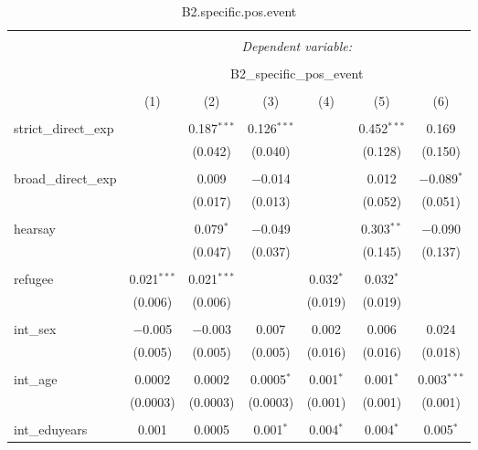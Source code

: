 
\begin{table}[H] \centering 
  \caption{B2.specific.pos.event} 
  \label{} 
\tiny 
\begin{tabular}{@{\extracolsep{4pt}}lcccccc} 
\\[-1.8ex]\hline 
\hline \\[-1.8ex] 
 & \multicolumn{6}{c}{\textit{Dependent variable:}} \\ 
\cline{2-7} 
\\[-1.8ex] & \multicolumn{6}{c}{B2\_specific\_pos\_event} \\ 
\\[-1.8ex] & (1) & (2) & (3) & (4) & (5) & (6)\\ 
\hline \\[-1.8ex] 
 strict\_direct\_exp &  & 0.187$^{***}$ & 0.126$^{***}$ &  & 0.452$^{***}$ & 0.169 \\ 
  &  & (0.042) & (0.040) &  & (0.128) & (0.150) \\ 
  & & & & & & \\ 
 broad\_direct\_exp &  & 0.009 & $-$0.014 &  & 0.012 & $-$0.089$^{*}$ \\ 
  &  & (0.017) & (0.013) &  & (0.052) & (0.051) \\ 
  & & & & & & \\ 
 hearsay &  & 0.079$^{*}$ & $-$0.049 &  & 0.303$^{**}$ & $-$0.090 \\ 
  &  & (0.047) & (0.037) &  & (0.145) & (0.137) \\ 
  & & & & & & \\ 
 refugee & 0.021$^{***}$ & 0.021$^{***}$ &  & 0.032$^{*}$ & 0.032$^{*}$ &  \\ 
  & (0.006) & (0.006) &  & (0.019) & (0.019) &  \\ 
  & & & & & & \\ 
 int\_sex & $-$0.005 & $-$0.003 & 0.007 & 0.002 & 0.006 & 0.024 \\ 
  & (0.005) & (0.005) & (0.005) & (0.016) & (0.016) & (0.018) \\ 
  & & & & & & \\ 
 int\_age & 0.0002 & 0.0002 & 0.0005$^{*}$ & 0.001$^{*}$ & 0.001$^{*}$ & 0.003$^{***}$ \\ 
  & (0.0003) & (0.0003) & (0.0003) & (0.001) & (0.001) & (0.001) \\ 
  & & & & & & \\ 
 int\_eduyears & 0.001 & 0.0005 & 0.001$^{*}$ & 0.004$^{*}$ & 0.004$^{*}$ & 0.005$^{*}$ \\ 

\end{tabular}
\end{table}
